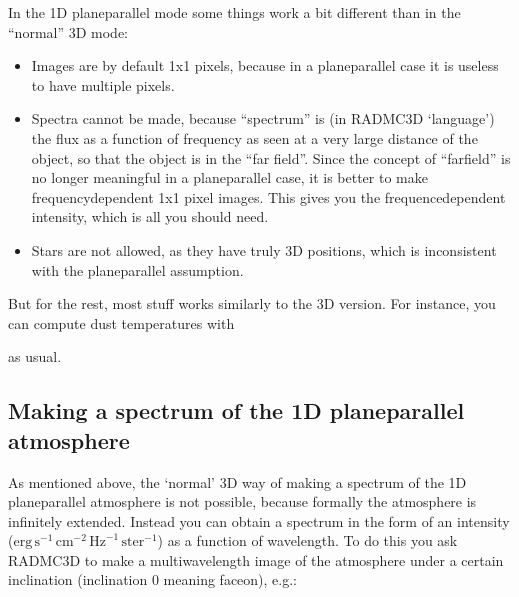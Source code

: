\documentclass[letterpaper,10pt,english]{sphinxmanual}
\begin{document}
In the 1\sphinxhyphen{}D plane\sphinxhyphen{}parallel mode some things work a bit different than in the
“normal” 3\sphinxhyphen{}D mode:
\begin{itemize}
\item {} 
Images are by default 1x1 pixels, because in a plane\sphinxhyphen{}parallel case it
is useless to have multiple pixels.

\item {} 
Spectra cannot be made, because “spectrum” is (in RADMC\sphinxhyphen{}3D ‘language’)
the flux as a function of frequency as seen at a very large distance of
the object, so that the object is in the “far field”. Since the concept of
“far\sphinxhyphen{}field” is no longer meaningful in a plane\sphinxhyphen{}parallel case, it is better
to make frequency\sphinxhyphen{}dependent 1x1 pixel images. This gives you the
frequence\sphinxhyphen{}dependent intensity, which is all you should need.

\item {} 
Stars are not allowed, as they have truly 3\sphinxhyphen{}D positions, which is
inconsistent with the plane\sphinxhyphen{}parallel assumption.

\end{itemize}

But for the rest, most stuff works similarly to the 3\sphinxhyphen{}D version. For instance,
you can compute dust temperatures with

\begin{sphinxVerbatim}[commandchars=\\\{\}]
 
\end{sphinxVerbatim}

as usual.


\subsection{Making a spectrum of the 1\sphinxhyphen{}D plane\sphinxhyphen{}parallel atmosphere}
\label{\detokenize{gridding:making-a-spectrum-of-the-1-d-plane-parallel-atmosphere}}
As mentioned above, the ‘normal’ 3\sphinxhyphen{}D way of making a spectrum of the 1\sphinxhyphen{}D
plane\sphinxhyphen{}parallel atmosphere is not possible, because formally the atmosphere is
infinitely extended. Instead you can obtain a spectrum in the form of an
intensity (\(\mathrm{erg}\,\mathrm{s}^{-1}\,\mathrm{cm}^{-2}\,\mathrm{Hz}^{-1}\,\mathrm{ster}^{-1}\))
as a function of wavelength. To do this you ask RADMC\sphinxhyphen{}3D to make a
multi\sphinxhyphen{}wavelength image of the atmosphere under a certain inclination
(inclination 0 meaning face\sphinxhyphen{}on), e.g.:
\end{document}
